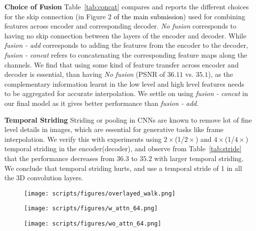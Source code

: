 \documentclass[10pt,twocolumn,letterpaper]{article}
\newcommand{\tabref}[1]{Table~\ref{#1}}
\newcommand{\twox}{$2\times$}
\newcommand{\fourx}{$4\times$}
\begin{document}
{\bf Choice of Fusion} \tabref{tab:concat} compares and reports the different choices for the skip connection (in Figure 2 \textcolor{black}{of the main submission}) used for combining features across encoder and corresponding decoder. \textit{No fusion } corresponds to having no skip connection between the layers of the encoder and decoder. While \textit{fusion - add } corresponds to adding the features from the encoder to the decoder, \textit{fusion - concat} refers to concatenating the corresponding feature maps along the channels. We find that using some kind of feature transfer across encoder and decoder is essential, than having \textit{No fusion } (PSNR of $36.11$ vs. $35.1$), as the complementary information learnt in the low level and high level features needs to be aggregated for accurate interpolation. We settle on using \textit{fusion - concat} in our final model as it gives better performance than \textit{fusion - add}. 

{\bf Temporal Striding} Striding or pooling in CNNs are known to remove lot of fine level details in images, which are essential for generative tasks like frame interpolation. We verify this with experiments using \twox{}(1/\twox{}) and \fourx{}(1/\fourx{}) temporal striding in the encoder(decoder), and observe from \tabref{tab:stride} that the performance decreases from $36.3$ to $35.2$ with larger temporal striding. We conclude that temporal striding hurts, and use a temporal stride of 1 in all the 3D convolution layers.

\begin{figure*}
     \centering


     \begin{subfigure}[t]{0.28\textwidth}
         \centering
         \texttt{[image: scripts/figures/overlayed\_walk.png]}
         \label{fig:overlay}
     \end{subfigure}
\begin{subfigure}[t]{0.28\textwidth}
         \centering
         \texttt{[image: scripts/figures/w\_attn\_64.png]}
         \label{fig:withAttn}
     \end{subfigure}
\begin{subfigure}[t]{0.28\textwidth}
         \centering
         \texttt{[image: scripts/figures/wo\_attn\_64.png]}
         \captionsetup{width=\textwidth}
         \label{fig:withoutAttn}
     \end{subfigure}
    \caption{{\bf Visualization of attention weighted feature maps} (a) The overlayed input frames. (b) The feature map of the channel with the highest attention weight in the network with feature gating. (c)  The same feature map without using the gating module. We observe higher activation (red) in (b) along the motion boundaries. Best viewed in color.
    }
    \label{fig:attnMaps}
\end{figure*}
\end{document}
